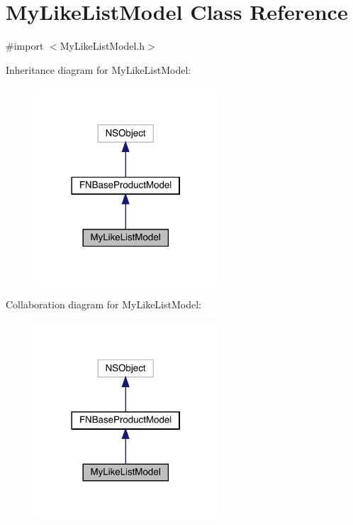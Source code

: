 \hypertarget{interface_my_like_list_model}{}\section{My\+Like\+List\+Model Class Reference}
\label{interface_my_like_list_model}


{\ttfamily \#import $<$My\+Like\+List\+Model.\+h$>$}



Inheritance diagram for My\+Like\+List\+Model\+:\nopagebreak
\begin{figure}[H]
\begin{center}
\leavevmode
\includegraphics[width=194pt]{interface_my_like_list_model__inherit__graph}
\end{center}
\end{figure}


Collaboration diagram for My\+Like\+List\+Model\+:\nopagebreak
\begin{figure}[H]
\begin{center}
\leavevmode
\includegraphics[width=194pt]{interface_my_like_list_model__coll__graph}
\end{center}
\end{figure}
